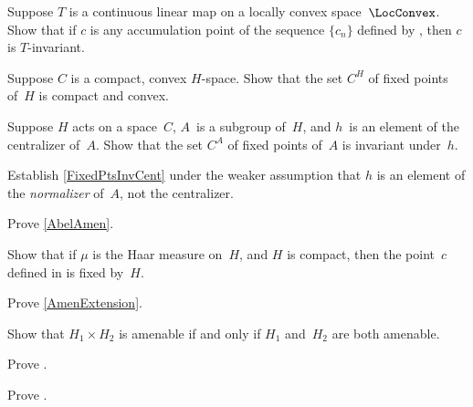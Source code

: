 \begin{exercises}

\item \label{lim(c_n)invt}
Suppose $T$ is a continuous linear map on a locally convex space~$\LocConvex$. Show that if $c$ is any accumulation point of the sequence $\{c_n\}$ defined by , then $c$ is $T$-invariant.

\item \label{FixedPtsCpctConv}
Suppose $C$ is a compact, convex $H$-space. Show that the set $C^H$ of fixed points of~$H$ is compact and convex.

\item \label{FixedPtsInvCent}
Suppose $H$ acts on a space~$C$, $A$~is a subgroup of~$H$, and $h$~is an element of the centralizer of~$A$. Show that the set $C^A$ of fixed points of~$A$ is invariant under~$h$.

\item \label{FixedPtsInvNorm}
Establish \cref{FixedPtsInvCent} under the weaker assumption that $h$ is an element of the \emph{normalizer} of~$A$, not the centralizer.

\item \label{AbelAmenEx}
Prove \cref{AbelAmen}.

\item \label{InvtMeas->FP}
Show that if $\mu$ is the Haar measure on~$H$, and $H$ is compact, then the point~$c$ defined in  is fixed by~$H$.

\item \label{AmenExtensionEx}
Prove \cref{AmenExtension}.

\item Show that $H_1 \times H_2$ is amenable if and only if $H_1$ and~$H_2$ are both amenable.

\item \label{SolvAmen}
Prove .

\item \label{CocpctSolv->Amen}
Prove .


\end{exercises}
